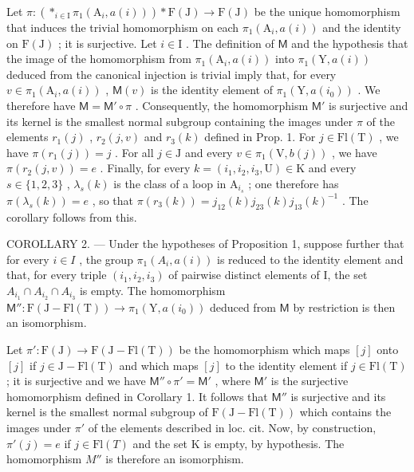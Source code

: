 Let \(\pi\colon (*_{i\in\mathrm{I}}\pi_1(\mathrm{A}_i,a(i)))*\mathrm{F}(\mathrm{J})\to\mathrm{F}(\mathrm{J})\) be the unique homomorphism that induces the trivial homomorphism on each \(\pi_1(\mathrm{A}_i,a(i))\) and the identity on \(\mathrm{F}(\mathrm{J})\) ; it is surjective. Let \(i\in\mathrm{I}\) . The definition of \(\mathsf{M}\) and the hypothesis that the image of the homomorphism from \(\pi_1(\mathrm{A}_i,a(i))\) into \(\pi_1(\mathrm{Y},a(i))\) deduced from the canonical injection is trivial imply that, for every \(v\in\pi_1(\mathrm{A}_i,a(i))\) , \(\mathsf{M}(v)\) is the identity element of \(\pi_1(\mathrm{Y},a(i_0))\) . We therefore have \(\mathsf{M}=\mathsf{M}'\circ\pi\) . Consequently, the homomorphism \(\mathsf{M}'\) is surjective and its kernel is the smallest normal subgroup containing the images under \(\pi\) of the elements \(r_1(j)\) , \(r_2(j,v)\) and \(r_3(k)\) defined in Prop. 1. For \(j\in\mathrm{Fl}(\mathrm{T})\) , we have \(\pi(r_1(j))=j\) . For all \(j\in\mathrm{J}\) and every \(v\in\pi_1(\mathrm{V},b(j))\) , we have \(\pi(r_2(j,v))=e\) . Finally, for every \(k=(i_1,i_2,i_3,\mathrm{U})\in\mathrm{K}\) and every \(s\in\{1,2,3\}\) , \(\lambda_s(k)\) is the class of a loop in \(\mathrm{A}_{i_s}\) ; one therefore has \(\pi(\lambda_s(k))=e\) , so that \(\pi(r_3(k))=j_{12}(k)j_{23}(k)j_{13}(k)^{-1}\) . The corollary follows from this.

COROLLARY 2. --- Under the hypotheses of Proposition 1, suppose further that for every \(i \in I\) , the group \(\pi_1(A_i, a(i))\) is reduced to the identity element and that, for every triple \((i_1, i_2, i_3)\) of pairwise distinct elements of I, the set \(A_{i_1} \cap A_{i_2} \cap A_{i_3}\) is empty. The homomorphism \(\mathsf{M}''\colon \mathrm{F}(\mathrm{J} - \mathrm{Fl}(\mathrm{T})) \to \pi_1(\mathrm{Y}, a(i_0))\) deduced from \(\mathsf{M}\) by restriction is then an isomorphism.

Let \(\pi'\colon\mathrm{F}(\mathrm{J})\to\mathrm{F}(\mathrm{J}-\mathrm{Fl}(\mathrm{T}))\) be the homomorphism which maps \([j]\) onto \([j]\) if \(j\in\mathrm{J}-\mathrm{Fl}(\mathrm{T})\) and which maps \([j]\) to the identity element if \(j\in\mathrm{Fl}(\mathrm{T})\) ; it is surjective and we have \(\mathsf{M}''\circ\pi'= \mathsf{M}'\) , where \(\mathsf{M}'\) is the surjective homomorphism defined in Corollary 1. It follows that \(\mathsf{M}''\) is surjective and its kernel is the smallest normal subgroup of \(\mathrm{F}(\mathrm{J}-\mathrm{Fl}(\mathrm{T}))\) which contains the images under \(\pi'\) of the elements described in loc. cit. Now, by construction, \(\pi'(j) = e\) if \(j \in \mathrm{Fl}(T)\) and the set K is empty, by hypothesis. The homomorphism \(M''\) is therefore an isomorphism.

